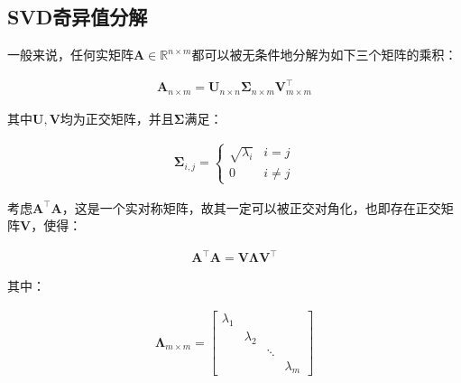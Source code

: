\documentclass[UTF8]{book}
\begin{document}
\subsection{SVD奇异值分解}
一般来说，任何实矩阵$\mathbf{A}\in \mathbb{R}^{n\times m}$都可以被无条件地分解为如下三个矩阵的乘积：
\begin{large}
    \begin{equation}
        \begin{aligned}
            \mathbf{A}_{n\times m}=\mathbf{U}_{n\times n}\mathbf{\Sigma}_{n\times m}\mathbf{V}_{m\times m}^\top
            \nonumber
        \end{aligned}
    \end{equation}
\end{large}
其中$\mathbf{U},\mathbf{V}$均为正交矩阵，并且$\mathbf{\Sigma}$满足：
\begin{large}
    \begin{equation}
        \begin{aligned}
            \mathbf{\Sigma}_{i,j}=\begin{cases}
                \sqrt{\lambda_i} & i=j\\
                0 & i\not = j
               \end{cases} 
            \nonumber
        \end{aligned}
    \end{equation}
\end{large}
考虑$\mathbf{A}^\top \mathbf{A}$，这是一个实对称矩阵，故其一定可以被正交对角化，也即存在正交矩阵$\mathbf{V}$，使得：
\begin{large}
    \begin{equation}
        \begin{aligned}
            \mathbf{A}^\top \mathbf{A}=\mathbf{V}\mathbf{\Lambda}\mathbf{V}^\top
            \nonumber
        \end{aligned}
    \end{equation}
\end{large}
其中：
\begin{large}
    \begin{equation}
        \begin{aligned}
            \mathbf{\Lambda}_{m\times m}=\begin{bmatrix}
                \lambda_1 &  &  & \\
                 & \lambda_2 &  & \\
                 &  & \ddots  & \\
                 &  &  &\lambda_m
               \end{bmatrix}
            \nonumber
        \end{aligned}
    \end{equation}
\end{large}
\end{document}
